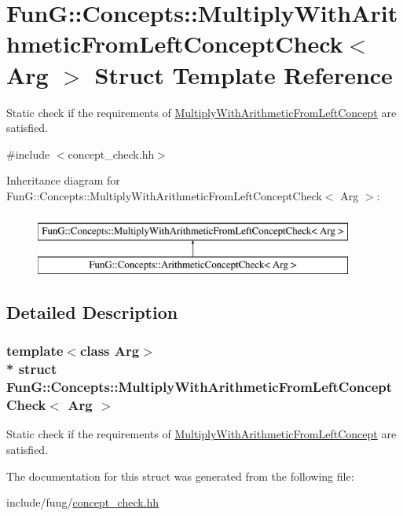 \hypertarget{structFunG_1_1Concepts_1_1MultiplyWithArithmeticFromLeftConceptCheck}{}\section{FunG\+:\+:Concepts\+:\+:Multiply\+With\+Arithmetic\+From\+Left\+Concept\+Check$<$ Arg $>$ Struct Template Reference}
\label{structFunG_1_1Concepts_1_1MultiplyWithArithmeticFromLeftConceptCheck}


Static check if the requirements of \hyperlink{structFunG_1_1Concepts_1_1MultiplyWithArithmeticFromLeftConcept}{Multiply\+With\+Arithmetic\+From\+Left\+Concept} are satisfied.  




{\ttfamily \#include $<$concept\+\_\+check.\+hh$>$}

Inheritance diagram for FunG\+:\+:Concepts\+:\+:Multiply\+With\+Arithmetic\+From\+Left\+Concept\+Check$<$ Arg $>$\+:\begin{figure}[H]
\begin{center}
\leavevmode
\includegraphics[height=2.000000cm]{structFunG_1_1Concepts_1_1MultiplyWithArithmeticFromLeftConceptCheck}
\end{center}
\end{figure}


\subsection{Detailed Description}
\subsubsection*{template$<$class Arg$>$\\*
struct Fun\+G\+::\+Concepts\+::\+Multiply\+With\+Arithmetic\+From\+Left\+Concept\+Check$<$ Arg $>$}

Static check if the requirements of \hyperlink{structFunG_1_1Concepts_1_1MultiplyWithArithmeticFromLeftConcept}{Multiply\+With\+Arithmetic\+From\+Left\+Concept} are satisfied. 

The documentation for this struct was generated from the following file\+:\begin{DoxyCompactItemize}
\item 
include/fung/\hyperlink{concept__check_8hh}{concept\+\_\+check.\+hh}\end{DoxyCompactItemize}
